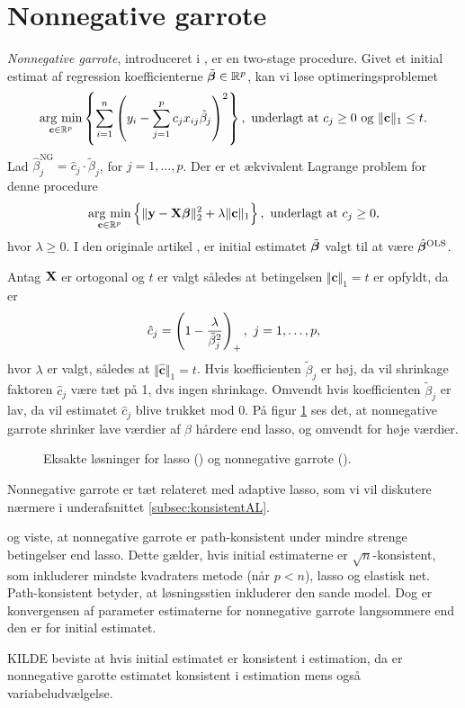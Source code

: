 \section{Nonnegative garrote}
\textit{Nonnegative garrote}, introduceret i \citep{nonnegative_garrote}, er en two-stage procedure. 
Givet et initial estimat af regression koefficienterne \(\tilde{\boldsymbol{\beta}} \in \mathbb{R}^p\), kan vi løse optimeringsproblemet
\begin{align}
\argmin_{\mathbf{c} \in \mathbb{R}^p}  \cbr{ \sum_{i=1}^n \del{y_i - \sum_{j=1}^p c_j x_{ij} \tilde{\beta}_j}^2}, \ \text{underlagt at } c_j \geq 0 \text{ og } \Vert \mathbf{c} \Vert_1 \leq t. \label{eq:2.19}
\end{align}
Lad \(\hat{\beta}_j^\text{NG} = \hat{c}_j \cdot \tilde{\beta}_j\), for \(j = 1, \ldots, p\).
Der er et ækvivalent Lagrange problem for denne procedure
\begin{align}
\argmin_{\mathbf{c} \in \mathbb{R}^p}  \cbr{\Vert \y - \X \tbeta \Vert_2^2 + \lambda \Vert \mathbf{c} \Vert_1}, \ \text{underlagt at } c_j \geq 0, \label{eq:nonnegative_garrote}
\end{align}
hvor \(\lambda \geq 0\).
I den originale artikel \citep{nonnegative_garrote}, er initial estimatet \(\tilde{\boldsymbol{\beta}}\) valgt til at være \(\hat{\boldsymbol{\beta}}^\text{OLS}\).
 
Antag \(\mathbf{X}\) er ortogonal og \(t\) er valgt således at betingelsen \(\Vert \mathbf{c} \Vert_1 = t\) er opfyldt, da er
\begin{align*}
\hat{c}_j = \del{1 - \frac{\lambda}{\tilde{\beta}_j^2}}_+, \ j = 1, \ldots, p,
\end{align*}
hvor \(\lambda\) er valgt, således at \(\Vert \hat{\mathbf{c}} \Vert_1 = t\).
Hvis koefficienten \(\tilde{\beta}_j\) er høj, da vil shrinkage faktoren \(\hat{c}_j\) være tæt på 1, dvs ingen shrinkage.
Omvendt hvis koefficienten \(\tilde{\beta}_j\) er lav, da vil estimatet \(\hat{c}_j\) blive trukket mod 0.
På figur \ref{fig:nonnegative_garrote} ses det, at nonnegative garrote shrinker lave værdier af \(\beta\) hårdere end lasso, og omvendt for høje værdier.
%
\begin{figure}[H]
\centering
\scalebox{0.8}{}
\caption[optional short text]{Eksakte løsninger for lasso () og nonnegative garrote ().} \label{fig:nonnegative_garrote}
\end{figure}
%
Nonnegative garrote er tæt relateret med adaptive lasso, som vi vil diskutere nærmere i underafsnittet \ref{subsec:konsistentAL}.

\citep{nonnegative_garrote_2007} og \citep{zou_hastie} viste, at nonnegative garrote er path-konsistent under mindre strenge betingelser end lasso.
Dette gælder, hvis initial estimaterne er \(\sqrt{n}\)-konsistent, som inkluderer mindste kvadraters metode (når \(p < n\)), lasso og elastisk net.
Path-konsistent betyder, at løsningsstien inkluderer den sande model.
Dog er konvergensen af parameter estimaterne for nonnegative garrote langsommere end den er for initial estimatet.


KILDE beviste at hvis initial estimatet er konsistent i estimation, da er nonnegative garotte estimatet konsistent i estimation mens også variabeludvælgelse.
